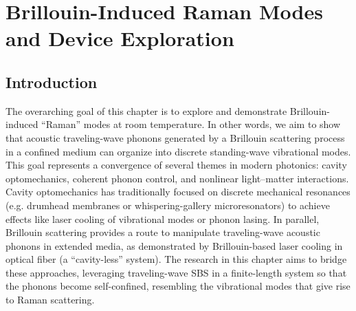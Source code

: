 \setcounter{rownumber}{0}
\singlespacing
\chapter{Brillouin-Induced Raman Modes and Device Exploration}
\label{ch:Raman}
\acresetall

\doublespacing


\section{Introduction}
\label{sec:Raman:Introduction}

The overarching goal of this chapter is to explore and demonstrate Brillouin-induced “Raman” modes at room temperature. In other words, we aim to show that acoustic traveling-wave phonons generated by a Brillouin scattering process in a confined medium can organize into discrete standing-wave vibrational modes. This goal represents a convergence of several themes in modern photonics: cavity optomechanics, coherent phonon control, and nonlinear light–matter interactions. Cavity optomechanics has traditionally focused on discrete mechanical resonances (e.g. drumhead membranes or whispering-gallery microresonators) to achieve effects like laser cooling of vibrational modes or phonon lasing. \cite{kippenberg2008cavity, chan2011laser, aspelmeyer2014cavity, vahala2009phonon} In parallel, Brillouin scattering provides a route to manipulate traveling-wave acoustic phonons in extended media, as demonstrated by Brillouin-based laser cooling in optical fiber (a “cavity-less” system). \cite{johnson2023laser, eggleton2013inducing, bahl2012observation, otterstrom2018optomechanical} The research in this chapter aims to bridge these approaches, leveraging traveling-wave SBS in a finite-length system so that the phonons become self-confined, resembling the vibrational modes that give rise to Raman scattering.

